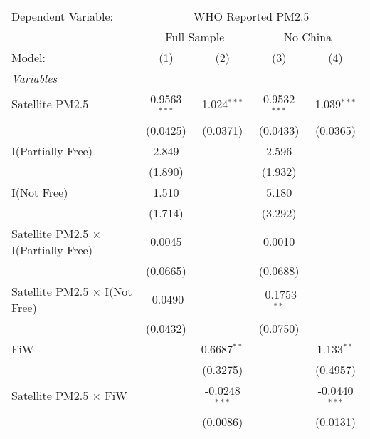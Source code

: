 
\begingroup
\centering
\begin{tabular}{lcccc}
   \tabularnewline \midrule \midrule
   Dependent Variable: & \multicolumn{4}{c}{WHO Reported PM2.5}\\
    & \multicolumn{2}{c}{Full Sample} & \multicolumn{2}{c}{No China} \\ \cmidrule(lr){2-3} \cmidrule(lr){4-5}
   Model:                                      & (1)            & (2)             & (3)            & (4)\\  
   \midrule
   \emph{Variables}\\
   Satellite PM2.5                             & 0.9563$^{***}$ & 1.024$^{***}$   & 0.9532$^{***}$ & 1.039$^{***}$\\   
                                               & (0.0425)       & (0.0371)        & (0.0433)       & (0.0365)\\   
   I(Partially Free)                           & 2.849          &                 & 2.596          &   \\   
                                               & (1.890)        &                 & (1.932)        &   \\   
   I(Not Free)                                 & 1.510          &                 & 5.180          &   \\   
                                               & (1.714)        &                 & (3.292)        &   \\   
   Satellite PM2.5 $\times$ I(Partially Free)  & 0.0045         &                 & 0.0010         &   \\   
                                               & (0.0665)       &                 & (0.0688)       &   \\   
   Satellite PM2.5 $\times$ I(Not Free)        & -0.0490        &                 & -0.1753$^{**}$ &   \\   
                                               & (0.0432)       &                 & (0.0750)       &   \\   
   FiW                                         &                & 0.6687$^{**}$   &                & 1.133$^{**}$\\   
                                               &                & (0.3275)        &                & (0.4957)\\   
   Satellite PM2.5 $\times$ FiW                &                & -0.0248$^{***}$ &                & -0.0440$^{***}$\\   
                                               &                & (0.0086)        &                & (0.0131)\\   

\end{tabular}
